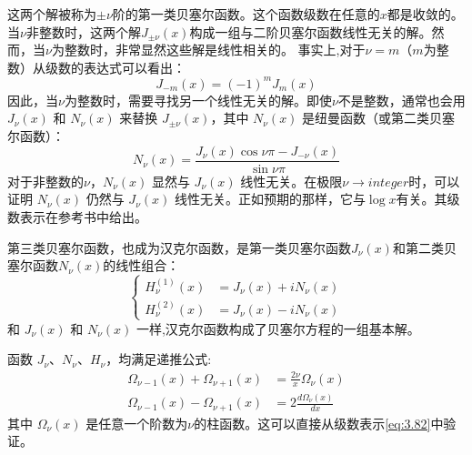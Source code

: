 \documentclass[lang=cn,10pt,newtx,bibend=biber,device=pad]{elegantbook}
\begin{document}
这两个解被称为$\pm\nu$阶的第一类贝塞尔函数。这个函数级数在任意的$x$都是收敛的。当$\nu$非整数时，这两个解$J_{\pm\nu}(x)$构成一组与二阶贝塞尔函数线性无关的解。然而，当$\nu$为整数时，非常显然这些解是线性相关的。
事实上,对于$\nu=m$（$m$为整数）从级数的表达式可以看出：
\begin{equation}\label{eq:3.84}
    J_{-m}(x) = (-1)^m J_m(x)
\end{equation}
因此，当$\nu$为整数时，需要寻找另一个线性无关的解。即使$\nu$不是整数，通常也会用$J_\nu(x)$ 和 $N_\nu(x)$ 来替换 $J_{\pm\nu}(x)$，其中 $N_\nu(x)$ 是纽曼函数（或第二类贝塞尔函数）：
\begin{equation}\label{eq:3.85}
    N_\nu(x) = \frac{J_\nu(x)\cos \nu\pi - J_{-\nu}(x)}{\sin \nu\pi}
\end{equation}
对于非整数的$\nu$，$N_\nu(x)$ 显然与 $J_\nu(x)$ 线性无关。在极限$\nu \to integer$时，可以证明 $N_\nu(x)$ 仍然与 $J_\nu(x)$ 线性无关。正如预期的那样，它与$\log{x}$有关。其级数表示在参考书中给出。

第三类贝塞尔函数，也成为汉克尔函数，是第一类贝塞尔函数$J_\nu(x)$和第二类贝塞尔函数$N_\nu(x)$的线性组合：
\begin{equation}\label{eq:3.86}
    \begin{cases}
        H_\nu^{(1)}(x) &= J_\nu(x) + iN_\nu(x) \\
        H_\nu^{(2)}(x) &= J_\nu(x) - iN_\nu(x)
    \end{cases}
\end{equation}
和 $J_\nu(x)$ 和 $N_\nu(x)$ 一样,汉克尔函数构成了贝塞尔方程的一组基本解。

函数 $J_\nu$、$N_\nu$、$H_\nu$，均满足递推公式:
\begin{align}\label{eq:3.88}
    \Omega_{\nu-1}(x) + \Omega_{\nu+1}(x) &= \frac{2\nu}{x} \Omega_{\nu}(x) \\
    \Omega_{\nu-1}(x) - \Omega_{\nu+1}(x) &= 2 \frac{d\Omega_{\nu}(x)}{dx}
\end{align}
其中 $\Omega_\nu(x)$ 是任意一个阶数为$\nu$的柱函数。这可以直接从级数表示\ref{eq:3.82}中验证。
\end{document}
